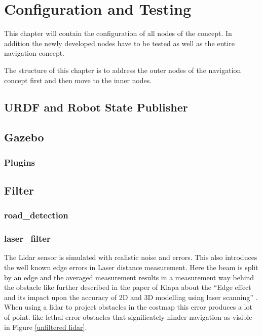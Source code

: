 \chapter{Configuration and Testing}
\label{configurationandtesting}
This chapter will contain the configuration of all nodes of the concept. In addition the newly developed nodes have to be tested as well as the entire navigation concept.


The structure of this chapter is to address the outer nodes of the navigation concept first and then move to the inner nodes.\\


\section{URDF and Robot State Publisher}

\section{Gazebo}

\subsection{Plugins}

\section{Filter}

\subsection{road\_detection}

\subsection{laser\_filter}


The Lidar sensor is simulated with realistic noise and errors. This also introduces the well known edge errors in Laser distance measurement. Here the beam is split by an edge and the averaged measurement results in a measurement way behind the obstacle like further described in the paper of Klapa about the ``Edge effect and its impact upon the accuracy of 2D and 3D modelling using laser scanning'' \cite{edgeeffect}.\\

When using a lidar to project obstacles in the costmap this error produces a lot of point. like lethal error obstacles that significately hinder navigation as visible in Figure \ref{unfiltered lidar}.

